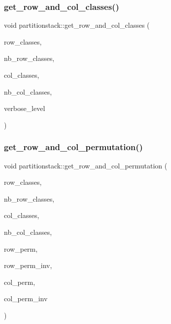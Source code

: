\subsubsection{\texorpdfstring{get\+\_\+row\+\_\+and\+\_\+col\+\_\+classes()}{get\_row\_and\_col\_classes()}}
{\footnotesize\ttfamily void partitionstack\+::get\+\_\+row\+\_\+and\+\_\+col\+\_\+classes (\begin{DoxyParamCaption}\item[{\mbox{\hyperlink{galois_8h_a09fddde158a3a20bd2dcadb609de11dc}{I\+NT}} $\ast$}]{row\+\_\+classes,  }\item[{\mbox{\hyperlink{galois_8h_a09fddde158a3a20bd2dcadb609de11dc}{I\+NT}} \&}]{nb\+\_\+row\+\_\+classes,  }\item[{\mbox{\hyperlink{galois_8h_a09fddde158a3a20bd2dcadb609de11dc}{I\+NT}} $\ast$}]{col\+\_\+classes,  }\item[{\mbox{\hyperlink{galois_8h_a09fddde158a3a20bd2dcadb609de11dc}{I\+NT}} \&}]{nb\+\_\+col\+\_\+classes,  }\item[{\mbox{\hyperlink{galois_8h_a09fddde158a3a20bd2dcadb609de11dc}{I\+NT}}}]{verbose\+\_\+level }\end{DoxyParamCaption})}

\mbox{\label{classpartitionstack_af633140828cd5d35678ac9e5612b22f8}} 
\subsubsection{\texorpdfstring{get\+\_\+row\+\_\+and\+\_\+col\+\_\+permutation()}{get\_row\_and\_col\_permutation()}}
{\footnotesize\ttfamily void partitionstack\+::get\+\_\+row\+\_\+and\+\_\+col\+\_\+permutation (\begin{DoxyParamCaption}\item[{\mbox{\hyperlink{galois_8h_a09fddde158a3a20bd2dcadb609de11dc}{I\+NT}} $\ast$}]{row\+\_\+classes,  }\item[{\mbox{\hyperlink{galois_8h_a09fddde158a3a20bd2dcadb609de11dc}{I\+NT}}}]{nb\+\_\+row\+\_\+classes,  }\item[{\mbox{\hyperlink{galois_8h_a09fddde158a3a20bd2dcadb609de11dc}{I\+NT}} $\ast$}]{col\+\_\+classes,  }\item[{\mbox{\hyperlink{galois_8h_a09fddde158a3a20bd2dcadb609de11dc}{I\+NT}}}]{nb\+\_\+col\+\_\+classes,  }\item[{\mbox{\hyperlink{galois_8h_a09fddde158a3a20bd2dcadb609de11dc}{I\+NT}} $\ast$}]{row\+\_\+perm,  }\item[{\mbox{\hyperlink{galois_8h_a09fddde158a3a20bd2dcadb609de11dc}{I\+NT}} $\ast$}]{row\+\_\+perm\+\_\+inv,  }\item[{\mbox{\hyperlink{galois_8h_a09fddde158a3a20bd2dcadb609de11dc}{I\+NT}} $\ast$}]{col\+\_\+perm,  }\item[{\mbox{\hyperlink{galois_8h_a09fddde158a3a20bd2dcadb609de11dc}{I\+NT}} $\ast$}]{col\+\_\+perm\+\_\+inv }\end{DoxyParamCaption})}

